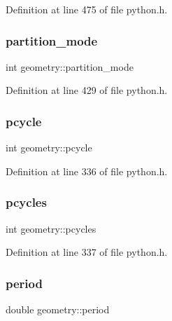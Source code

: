 Definition at line 475 of file python.\+h.

\mbox{\label{structgeometry_ae14099bb9c9edf24ac997cf8f30c7aaf}} 
\subsubsection{\texorpdfstring{partition\+\_\+mode}{partition\_mode}}
{\footnotesize\ttfamily int geometry\+::partition\+\_\+mode}



Definition at line 429 of file python.\+h.

\mbox{\label{structgeometry_a5c5643e70e2f927fac6f1ff6e9ecb489}} 
\subsubsection{\texorpdfstring{pcycle}{pcycle}}
{\footnotesize\ttfamily int geometry\+::pcycle}



Definition at line 336 of file python.\+h.

\mbox{\label{structgeometry_af1df42c04bb7980f13bbb390f7fbb222}} 
\subsubsection{\texorpdfstring{pcycles}{pcycles}}
{\footnotesize\ttfamily int geometry\+::pcycles}



Definition at line 337 of file python.\+h.

\mbox{\label{structgeometry_aeb6c26a04eb2ee8d029e2e151b42aada}} 
\subsubsection{\texorpdfstring{period}{period}}
{\footnotesize\ttfamily double geometry\+::period}



